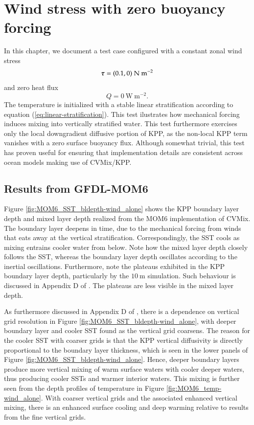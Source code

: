 \chapter{Wind stress with zero buoyancy forcing}
\label{chapter:wind_alone}

In this chapter, we document a test case configured with a constant
zonal wind stress 
\begin{equation}
 \mbox{\boldmath $\tau$}  =  (0.1, 0)~\mbox{N}~\mbox{m}^{-2}
\end{equation}
and zero heat flux
\begin{equation}
Q=0~\mbox{W}~\mbox{m}^{-2}.
\end{equation}
The temperature is initialized with a stable linear stratification
according to equation (\ref{eq:linear-stratification}).  This test
ilustrates how mechanical forcing induces mixing into vertically
stratified water.  This test furthermore exercises only the local
downgradient diffusive portion of KPP, as the non-local KPP term
vanishes with a zero surface buoyancy flux.  Although somewhat
trivial, this test has proven useful for ensuring that implementation
details are consistent across ocean models making use of CVMix/KPP.

\minitoc


\section{Results from GFDL-MOM6}
\label{section:wind_only_mom6}

Figure \ref{fig:MOM6_SST_bldepth-wind_alone} shows the KPP boundary
layer depth and mixed layer depth realized from the MOM6
implementation of CVMix.  The boundary layer deepens in time, due to
the mechanical forcing from winds that eats away at the vertical
stratification.  Correspondingly, the SST cools as mixing entrains
cooler water from below.  Note how the mixed layer depth closely
follows the SST, whereas the boundary layer depth oscillates according
to the inertial oscillations.  Furthermore, note the plateaus
exhibited in the KPP boundary layer depth, particularly by the
$10~\mbox{m}$ simulation.  Such behaviour is discussed in Appendix D
of \cite{LargeKPP}.  The plateaus are less visible in the mixed layer
depth.

As furthermore discussed in Appendix D of \cite{LargeKPP}, there is a
dependence on vertical grid resolution in Figure
\ref{fig:MOM6_SST_bldepth-wind_alone}, with deeper boundary layer and
cooler SST found as the vertical grid coarsens.  The reason for the
cooler SST with coarser grids is that the KPP vertical diffusivity is
directly proportional to the boundary layer thickness, which is seen
in the lower panels of Figure \ref{fig:MOM6_SST_bldepth-wind_alone}.
Hence, deeper boundary layers produce more vertical mixing of warm
surface waters with cooler deeper waters, thus producing cooler SSTs
and warmer interior waters.  This mixing is further seen from the
depth profiles of temperature in Figure
\ref{fig:MOM6_temp-wind_alone}.  With coarser vertical grids and the
associated enhanced vertical mixing, there is an enhanced surface
cooling and deep warming relative to results from the fine vertical
grids.

